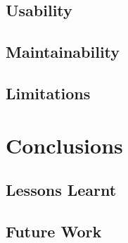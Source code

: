 \documentclass[authoryearcitations]{UoYCSproject}
\begin{document}
\section{Usability}

\section{Maintainability}

\section{Limitations}

\chapter{Conclusions}

\section{Lessons Learnt}

\section{Future Work}



\end{document}
